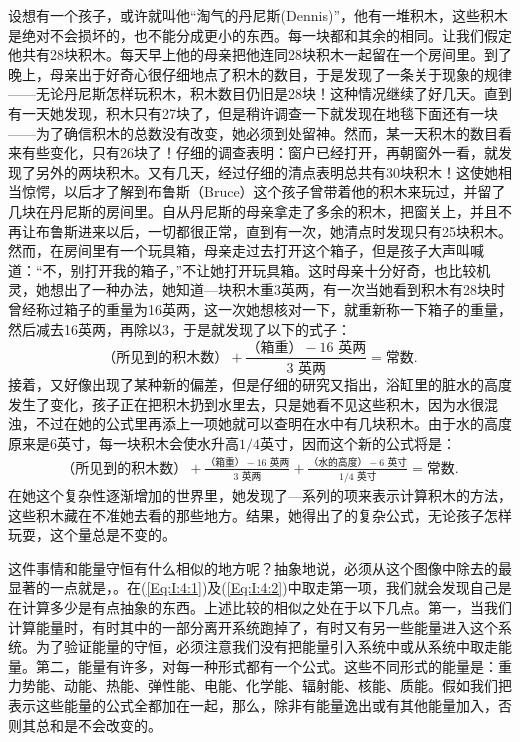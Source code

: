 设想有一个孩子，或许就叫他“淘气的丹尼斯(Dennis)”，他有一堆积木，这些积木是绝对不会损坏的，也不能分成更小的东西。每一块都和其余的相同。让我们假定他共有28块积木。每天早上他的母亲把他连同28块积木一起留在一个房间里。到了晚上，母亲出于好奇心很仔细地点了积木的数目，于是发现了一条关于现象的规律——无论丹尼斯怎样玩积木，积木数目仍旧是28块！这种情况继续了好几天。直到有一天她发现，积木只有27块了，但是稍许调查一下就发现在地毯下面还有一块——为了确信积木的总数没有改变，她必须到处留神。然而，某一天积木的数目看来有些变化，只有26块了！仔细的调查表明：窗户已经打开，再朝窗外一看，就发现了另外的两块积木。又有几天，经过仔细的清点表明总共有30块积木！这使她相当惊愕，以后才了解到布鲁斯（Bruce）这个孩子曾带着他的积木来玩过，并留了几块在丹尼斯的房间里。自从丹尼斯的母亲拿走了多余的积木，把窗关上，并且不再让布鲁斯进来以后，一切都很正常，直到有一次，她清点时发现只有25块积木。然而，在房间里有一个玩具箱，母亲走过去打开这个箱子，但是孩子大声叫喊道：“不，别打开我的箱子，”不让她打开玩具箱。这时母亲十分好奇，也比较机灵，她想出了一种办法，她知道—块积木重3英两，有一次当她看到积木有28块时曾经称过箱子的重量为16英两，这一次她想核对一下，就重新称一下箱子的重量，然后减去16英两，再除以3，于是就发现了以下的式子：
\begin{equation}
    \label{Eq:I:4:1}
    \text{（所见到的积木数）}
    +
    \frac{\text{（箱重）}-\text{$16$ 英两}}{\text{$3$ 英两}}=
    \text{常数}.
\end{equation}
接着，又好像出现了某种新的偏差，但是仔细的研究又指出，浴缸里的脏水的高度发生了变化，孩子正在把积木扔到水里去，只是她看不见这些积木，因为水很混浊，不过在她的公式里再添上一项她就可以查明在水中有几块积木。由于水的高度原来是6英寸，每一块积木会使水升高$1/4$英寸，因而这个新的公式将是：
\begin{align}
    \label{Eq:I:4:2}
    \text{（所见到的积木数）}
    +
    \frac{\text{（箱重）}-\text{$16$ 英两}}{\text{$3$ 英两}} +
    \frac{\text{（水的高度）}-\text{$6$ 英寸}}{\text{$1/4$ 英寸}}
    =
    \text{常数}.
\end{align}
在她这个复杂性逐渐增加的世界里，她发现了—系列的项来表示计算积木的方法，这些积木藏在不准她去看的那些地方。结果，她得出了的复杂公式，无论孩子怎样玩耍，这个量总是不变的。

这件事情和能量守恒有什么相似的地方呢？抽象地说，必须从这个图像中除去的最显著的一点就是，。在(\ref{Eq:I:4:1})及(\ref{Eq:I:4:2})中取走第一项，我们就会发现自己是在计算多少是有点抽象的东西。上述比较的相似之处在于以下几点。第一，当我们计算能量时，有时其中的一部分离开系统跑掉了，有时又有另一些能量进入这个系统。为了验证能量的守恒，必须注意我们没有把能量引入系统中或从系统中取走能量。第二，能量有许多，对每一种形式都有一个公式。这些不同形式的能量是：重力势能、动能、热能、弹性能、电能、化学能、辐射能、核能、质能。假如我们把表示这些能量的公式全都加在一起，那么，除非有能量逸出或有其他能量加入，否则其总和是不会改变的。

